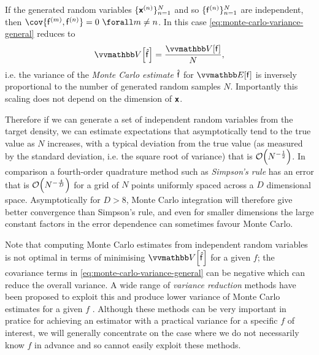 If the generated random variables $\lbrace \boldsymbol{\mathsf{x}}^{(n)}\rbrace_{n=1}^N$ and so $\lbrace \mathsf{f}^{(n)}\rbrace_{n=1}^N$ are independent, then $\cov{\rvar{f}^{(m)}, \rvar{f}^{(n)}} = 0 ~\forall m\neq n$. In this case \eqref{eq:monte-carlo-variance-general} reduces to
\begin{equation}\label{eq:monte-carlo-variance-independent}
  \var{\skew{2}{\hat}{\rvar{f}}}
  =
  \frac{\var{\rvar{f}}}{N},
\end{equation}
i.e. the variance of the \emph{Monte Carlo estimate} $\hat{\mathsf{f}}$ for $\expc{\rvar{f}}$ is inversely proportional to the number of generated random samples $N$. Importantly this scaling does not depend on the dimension of $\boldsymbol{\mathsf{x}}$. 

Therefore if we can generate a set of independent random variables from the target density, we can estimate expectations that asymptotically tend to the true value as $N$ increases, with a typical deviation from the true value (as measured by the standard deviation, i.e. the square root of variance) that is $\mathcal{O}\lpa N^{-\frac{1}{2}}\rpa$. In comparison a fourth-order quadrature method such as \emph{Simpson's rule} has an error that is $\mathcal{O}\lpa N^{-\frac{4}{D}}\rpa$ for a grid of $N$ points uniformly spaced across a $D$ dimensional space. Asymptotically for $D > 8$, Monte Carlo integration will therefore give better convergence than Simpson's rule, and even for smaller dimensions the large constant factors in the error dependence can sometimes favour Monte Carlo.

Note that computing Monte Carlo estimates from independent random variables is not optimal in terms of minimising $\var{\skew{2}{\hat}{\rvar{f}}}$ for a given $f$; the covariance terms in \eqref{eq:monte-carlo-variance-general} can be negative which can reduce the overall variance. A wide range of \emph{variance reduction} methods have been proposed to exploit this and produce lower variance of Monte Carlo estimates for a given $f$ \citep{kroese2011variance}. Although these methods can be very important in pratice for achieving an estimator with a practical variance for a specific $f$ of interest, we will generally concentrate on the case where we do not necessarily know $f$ in advance and so cannot easily exploit these methods. %

